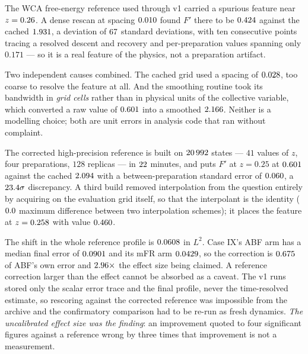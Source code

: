 The WCA free-energy reference used through v1 carried a spurious feature near $z = 0.26$. A
dense rescan at spacing $0.010$ found $F'$ there to be $0.424$ against the cached
$1.931$, a deviation of $67$ standard deviations, with ten consecutive
points tracing a resolved descent and recovery and per-preparation values spanning only $0.171$
--- so it is a real feature of the physics, not a preparation artifact.

Two independent causes combined. The cached grid used a spacing of $0.028$, too coarse to
resolve the feature at all. And the smoothing routine took its bandwidth in \emph{grid cells}
rather than in physical units of the collective variable, which converted a raw value of
$0.601$ into a smoothed $2.166$. Neither is a modelling choice; both are unit
errors in analysis code that ran without complaint.

The corrected high-precision reference is built on $20\,992$ states --- $41$ values of $z$,
four preparations, $128$ replicas --- in $22$ minutes, and puts $F'$ at $z = 0.25$ at
$0.601$ against the cached $2.094$ with a between-preparation standard error of
$0.060$, a $23.4\sigma$ discrepancy. A third build removed interpolation from the
question entirely by acquiring on the evaluation grid itself, so that the interpolant is the
identity ($0.0$ maximum difference between two interpolation schemes); it places the
feature at $z = 0.258$ with value $0.460$.

\begin{remark}
\label{rem:why_fresh}
The shift in the whole reference profile is $0.0608$ in $L^2$. Case IX's ABF arm has a
median final error of $0.0901$ and its mFR arm $0.0429$, so the correction is
$0.675$ of ABF's own error and $2.96\times$ the effect size being
claimed. A reference correction larger than the effect cannot be absorbed as a caveat. The v1
runs stored only the scalar error trace and the final profile, never the time-resolved estimate,
so rescoring against the corrected reference was impossible from the archive and the confirmatory
comparison had to be re-run as fresh dynamics. \emph{The uncalibrated effect size was the
finding}: an improvement quoted to four significant figures against a reference wrong by three
times that improvement is not a measurement.
\end{remark}

